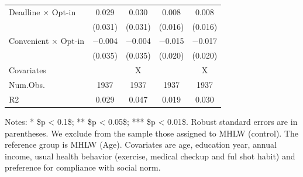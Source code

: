 \documentclass[
]{article}
\begin{document}
\begin{table}
\begin{threeparttable}
\begin{tabular}[t]{lcccc}
Deadline $\times$ Opt-in & \num{0.029} & \num{0.030} & \num{0.008} & \num{0.008}\\
 & (\num{0.031}) & (\num{0.031}) & (\num{0.016}) & (\num{0.016})\\
Convenient $\times$ Opt-in & \num{-0.004} & \num{-0.004} & \num{-0.015} & \num{-0.017}\\
 & (\num{0.035}) & (\num{0.035}) & (\num{0.020}) & (\num{0.020})\\
\midrule
Covariates &  & X &  & X\\
Num.Obs. & \num{1937} & \num{1937} & \num{1937} & \num{1937}\\
R2 & \num{0.029} & \num{0.047} & \num{0.019} & \num{0.030}\\
\bottomrule
\end{tabular}
\begin{tablenotes}
\item Notes: * \$p < 0.1\$; ** \$p < 0.05\$; *** \$p < 0.01\$. Robust standard errors are in parentheses. We exclude from the sample those assigned to MHLW (control). The reference group is MHLW (Age). Covariates are age, education year, annual income, usual health behavior (exercise, medical checkup and ful shot habit) and preference for compliance with social norm.
\end{tablenotes}
\end{threeparttable}
\end{table}
\end{document}
